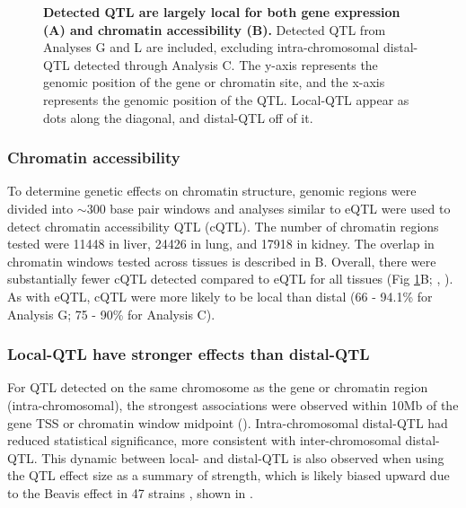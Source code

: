 \documentclass[10pt,letterpaper]{article}
\newcommand{\WV}[2]{\textcolor{red}{#1\footnote{\textcolor{red}{WV: #2}}}}
\begin{document}

\begin{figure}[h!]
\caption{\textbf{Detected QTL are largely local for both gene expression (A) and chromatin accessibility (B).} 
Detected QTL from Analyses G and L are included, excluding intra-chromosomal distal-QTL detected through Analysis C. The y-axis represents the genomic position of the gene or chromatin site, and the x-axis represents the genomic position of the QTL. Local-QTL appear as dots along the diagonal, and distal-QTL off of it.
\label{fig:grid_plot}}
\end{figure}

\subsubsection*{Chromatin accessibility}
To determine genetic effects on chromatin structure, genomic regions were divided into $\sim$300 base pair windows and analyses similar to eQTL were used to detect chromatin accessibility QTL (cQTL). The number of chromatin regions tested were 11448 in liver, 24426 in lung, and 17918 in kidney. The overlap in chromatin windows tested across tissues is described in B. Overall, there were substantially fewer cQTL detected compared to eQTL for all tissues (Fig \ref{fig:grid_plot}B; , ). As with eQTL, cQTL were more likely to be local than distal (66 - 94.1\% for Analysis G; 75 - 90\% for Analysis C).

\subsubsection*{Local-QTL have stronger effects than distal-QTL}
For QTL detected on the same chromosome as the gene or chromatin region (intra-chromosomal), the strongest associations were observed within 10Mb of the gene TSS or chromatin window midpoint (). Intra-chromosomal distal-QTL had reduced statistical significance, more consistent with inter-chromosomal distal-QTL. This dynamic between local- and distal-QTL is also observed when using the QTL effect size as a summary of strength, which is likely biased upward due to the Beavis effect in 47 strains \cite{Keele2019}, shown in .
\end{document}
